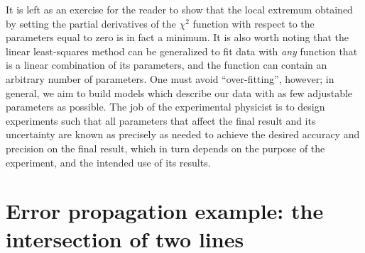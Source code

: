 \documentclass{article}
\begin{document}
It is left as an exercise for the reader to show that the local extremum obtained by setting the partial derivatives of the $\chi^2$ function with respect to the parameters equal to zero is in fact a minimum. It is also worth noting that the linear least-squares method can be generalized to fit data with \emph{any} function that is a linear combination of its parameters, and the function can contain an arbitrary number of parameters. One must avoid ``over-fitting'', however; in general, we aim to build models which describe our data with as few adjustable parameters as possible. The job of the experimental physicist is to design experiments such that all parameters that affect the final result and its uncertainty are known as precisely as needed to achieve the desired accuracy and precision on the final result, which in turn depends on the purpose of the experiment, and the intended use of its results.

\section{Error propagation example: the intersection of two lines}
\end{document}
